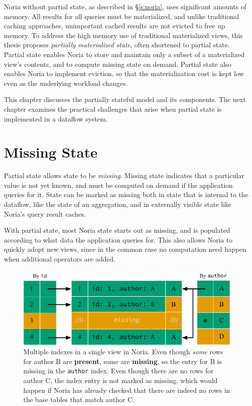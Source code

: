 Noria without partial state, as described in \S\ref{s:noria}, uses significant
amounts of memory. All results for all queries must be materialized, and unlike
traditional caching approaches, unimportant cached results are not evicted to
free up memory. To address the high memory use of traditional materialized
views, this thesis proposes \textit{partially materialized state}, often
shortened to partial state. Partial state enables Noria to store and maintain
only a subset of a materialized view's contents, and to compute missing state on
demand. Partial state also enables Noria to implement eviction, so that the
materialization cost is kept low even as the underlying workload changes.

This chapter discusses the partially stateful model and its components. The next
chapter examines the practical challenges that arise when partial state is
implemented in a dataflow system.

\section{Missing State}
\label{s:missing}

Partial state allows state to be \textit{missing}. Missing state indicates that
a particular value is not yet known, and must be computed on demand if the
application queries for it. State can be marked as missing both in state that is
internal to the dataflow, like the state of an aggregation, and in externally
visible state like Noria's query result caches.

With partial state, most Noria state starts out as missing, and is populated
according to what data the application queries for. This also allows Noria to
quickly adopt new views, since in the common case no computation need happen
when additional operators are added.

\begin{figure}
  \centering
  \includegraphics{diagrams/Indexing.pdf}
  \caption{Multiple indexes in a single view in Noria. Even though \emph{some}
  rows for author B are \textbf{\color{set3}present}, some are
  \textbf{\color{set2}missing}, so the entry for B is missing in the
  \texttt{author} index. Even though there are no rows for author C, the index
  entry is not marked as missing, which would happen if Noria has already
  checked that there are indeed no rows in the base tables that match author C.}
  \label{f:indexing}
\end{figure}

